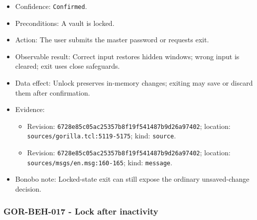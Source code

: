 \documentclass[
  letterpaper,
]{article}
\newcommand{\passthrough}[1]{#1}
\providecommand{\tightlist}{%
  \setlength{\itemsep}{0pt}\setlength{\parskip}{0pt}}
\begin{document}
\begin{itemize}
\tightlist
\item
  Confidence: \passthrough{\lstinline!Confirmed!}.
\item
  Preconditions: A vault is locked.
\item
  Action: The user submits the master password or requests exit.
\item
  Observable result: Correct input restores hidden windows; wrong input is cleared; exit uses close safeguards.
\item
  Data effect: Unlock preserves in-memory changes; exiting may save or discard them after confirmation.
\item
  Evidence:

  \begin{itemize}
  \tightlist
  \item
    Revision: \nolinkurl{6728e85c05ac25357b8f19f541487b9d26a97402}; location: \nolinkurl{sources/gorilla.tcl:5119-5175};
    kind: \passthrough{\lstinline!source!}.
  \item
    Revision: \nolinkurl{6728e85c05ac25357b8f19f541487b9d26a97402}; location: \nolinkurl{sources/msgs/en.msg:160-165};
    kind: \passthrough{\lstinline!message!}.
  \end{itemize}
\item
  Bonobo note: Locked-state exit can still expose the ordinary unsaved-change decision.
\end{itemize}

\subsubsection{GOR-BEH-017 - Lock after inactivity}\label{gor-beh-017---lock-after-inactivity}
\end{document}
